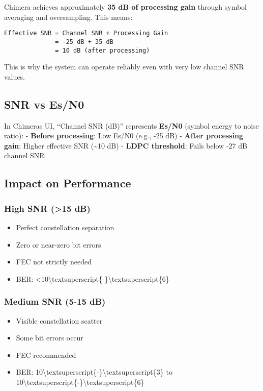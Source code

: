 Chimera achieves approximately \textbf{35 dB of processing gain} through
symbol averaging and oversampling. This means:

\begin{verbatim}
Effective SNR = Channel SNR + Processing Gain
              = -25 dB + 35 dB
              = 10 dB (after processing)
\end{verbatim}

This is why the system can operate reliably even with very low channel
SNR values.

\subsection{SNR vs Es/N0}\label{snr-vs-esn0}

In Chimera\textquotesingle s UI, ``Channel SNR (dB)'' represents
\textbf{Es/N0} (symbol energy to noise ratio): - \textbf{Before
processing}: Low Es/N0 (e.g., -25 dB) - \textbf{After processing gain}:
Higher effective SNR (\textasciitilde10 dB) - \textbf{LDPC threshold}:
Fails below -27 dB channel SNR

\subsection{Impact on Performance}\label{impact-on-performance}

\subsubsection{High SNR (\textgreater15 dB)}\label{high-snr-15-db}

\begin{itemize}
\tightlist
\item
  Perfect constellation separation
\item
  Zero or near-zero bit errors
\item
  FEC not strictly needed
\item
  BER:
  \textless10\textbackslash textsuperscript\{-\}\textbackslash textsuperscript\{6\}
\end{itemize}

\subsubsection{Medium SNR (5-15 dB)}\label{medium-snr-5-15-db}

\begin{itemize}
\tightlist
\item
  Visible constellation scatter
\item
  Some bit errors occur
\item
  FEC recommended
\item
  BER:
  10\textbackslash textsuperscript\{-\}\textbackslash textsuperscript\{3\}
  to
  10\textbackslash textsuperscript\{-\}\textbackslash textsuperscript\{6\}
\end{itemize}

